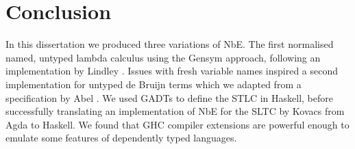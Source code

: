 \chapter{Conclusion}
\label{chap:conclusion}


% 


In this dissertation we produced three variations of NbE. The first normalised named, untyped lambda calculus using the Gensym approach, following an implementation by Lindley \cite{slides}. Issues with fresh variable names inspired a second implementation for untyped de Bruijn terms which we adapted from a specification by Abel \cite{deBruijn}. We used GADTs to define the STLC in Haskell, before successfully translating an implementation of NbE for the SLTC by Kovacs \cite{AgdaNbe} from Agda to Haskell. We found that GHC compiler extensions are powerful enough to emulate some features of dependently typed languages.

